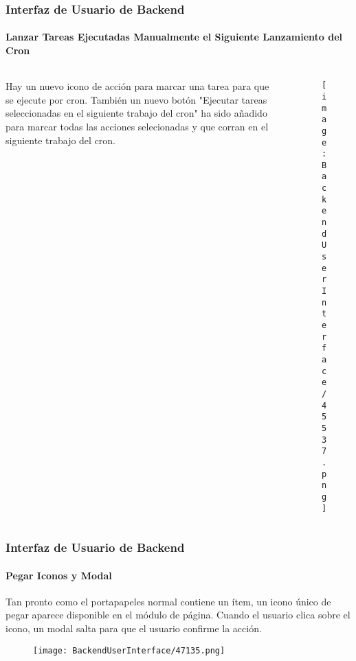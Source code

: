 \begin{frame}[fragile]
	\frametitle{Interfaz de Usuario de Backend}
	\framesubtitle{Lanzar Tareas Ejecutadas Manualmente el Siguiente Lanzamiento del Cron}

	\begin{columns}[T]
		\begin{column}{0.3\textwidth}
			Hay un nuevo icono de acción para marcar una tarea para que se ejecute por cron. También un nuevo botón
			"Ejecutar tareas seleccionadas en el siguiente trabajo del cron" ha sido añadido para marcar todas las acciones selecionadas
			y que corran en el siguiente trabajo del cron.
		\end{column}

		\begin{column}{0.7\textwidth}
			\begin{figure}\vspace{-0.6cm}
				\texttt{[image: BackendUserInterface/45537.png]}
			\end{figure}
		\end{column}
	\end{columns}

\end{frame}

\begin{frame}[fragile]
	\frametitle{Interfaz de Usuario de Backend}
	\framesubtitle{Pegar Iconos y Modal}

	Tan pronto como el portapapeles normal contiene un ítem, un icono único de pegar aparece disponible
	en el módulo de página. Cuando el usuario clica sobre el icono, un modal salta para que el usuario
	confirme la acción.

	\begin{figure}\vspace{-0.2cm}
		\texttt{[image: BackendUserInterface/47135.png]}
	\end{figure}

\end{frame}

